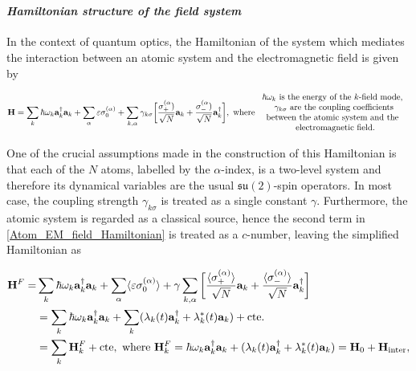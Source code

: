 \documentclass{homework}
\begin{document}
\blanky \\

\paragraph{\textit{Hamiltonian structure of the field system}}

In the context of quantum optics, the Hamiltonian of the system which mediates the interaction between an atomic system and the electromagnetic field is given by 

\begin{equation}
    {\bf H} = \sum_{k} \hbar \omega_k {\bf a}_k^\dagger {\bf a}_k + \sum_{\alpha} \varepsilon \sigma_0^{(\alpha)} + \sum_{k, \alpha} \gamma_{k \sigma} \bigg[ \frac{\sigma_+^{(\alpha})}{\sqrt{N}} {\bf a}_k + \frac{\sigma_-^{(\alpha})}{\sqrt{N}} {\bf a}_k^\dagger \bigg], \textnormal{ where } \begin{array}{c}
         \textnormal{$\hbar \omega_k$ is the energy of the $k$-field mode, }  \\
         \textnormal{$\gamma_{k\sigma}$ are the coupling coefficients} \\
         \textnormal{between the atomic system and the } \\
         \textnormal{ electromagnetic field.}
    \end{array}
    \label{Atom_EM_field_Hamiltonian}
\end{equation}

One of the crucial assumptions made in the construction of this Hamiltonian is that each of the $N$ atoms, labelled by the $\alpha$-index, is a two-level system and therefore its dynamical variables are the usual $\mathfrak{s}\mathfrak{u}(2)$-spin operators. In most case, the coupling strength $\gamma_{k\sigma}$ is treated as a single constant $\gamma$. Furthermore, the atomic system is regarded as a classical source, hence the second term in \cref{Atom_EM_field_Hamiltonian} is treated as a $c$-number, leaving the simplified Hamiltonian as 

\begin{equation}
\begin{split}
     {\bf H}^F =& \sum_{k} \hbar \omega_k {\bf a}_k^\dagger {\bf a}_k + \sum_{\alpha} \langle \varepsilon \sigma_0^{(\alpha)} \rangle + \gamma \sum_{k, \alpha} \bigg[\frac{\langle \sigma_+^{(\alpha)} \rangle}{\sqrt{N}} {\bf a}_k + \frac{\langle \sigma_-^{(\alpha)} \rangle}{\sqrt{N}} {\bf a}_k^\dagger\bigg] \\ 
     &= \sum_{k} \hbar\omega_k {\bf a}_k^\dagger {\bf a}_k + \sum_{k} (\lambda_k(t) {\bf a}_k^\dagger + \lambda_{k}^{*}(t) {\bf a}_k) + \textnormal{cte.}\\
     &= \sum_{k} {\bf H}_k^F + \textnormal{cte}, \textnormal{ where } {\bf H}_k^F = \hbar\omega_k {\bf a}_k^\dagger {\bf a}_k +  (\lambda_k(t) {\bf a}_k^\dagger + \lambda_{k}^{*}(t) {\bf a}_k) = {\bf H}_0 + {\bf H}_{{\textnormal{inter}}},
     \label{Atom_EM_field_Effective_Hamiltonian}
\end{split}
\end{equation}
\end{document}
